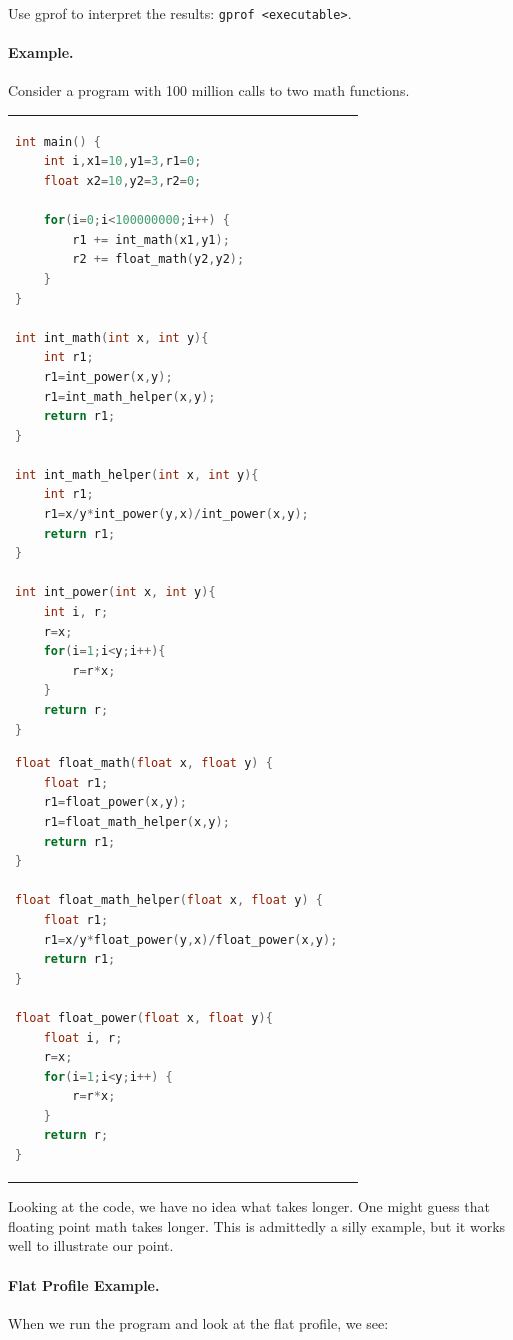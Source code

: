 Use gprof to interpret the results: {\tt gprof <executable>}.

\paragraph*{Example.} Consider a program with 100 million calls 
to two math functions.

\begin{tabular}{ll}
\begin{minipage}{.5\textwidth}
\begin{lstlisting}[language=C,basicstyle=\scriptsize]
int main() {
    int i,x1=10,y1=3,r1=0;
    float x2=10,y2=3,r2=0;

    for(i=0;i<100000000;i++) {
        r1 += int_math(x1,y1);
        r2 += float_math(y2,y2);
    }
}

int int_math(int x, int y){
    int r1;
    r1=int_power(x,y);
    r1=int_math_helper(x,y);
    return r1;
}

int int_math_helper(int x, int y){
    int r1;
    r1=x/y*int_power(y,x)/int_power(x,y);
    return r1;
}

int int_power(int x, int y){
    int i, r;
    r=x;
    for(i=1;i<y;i++){
        r=r*x;
    }
    return r;
}
\end{lstlisting}
\end{minipage}
\begin{minipage}{0.5\textwidth}
\begin{lstlisting}[language=C]
float float_math(float x, float y) {
    float r1;
    r1=float_power(x,y);
    r1=float_math_helper(x,y);
    return r1;
}

float float_math_helper(float x, float y) {
    float r1;
    r1=x/y*float_power(y,x)/float_power(x,y);
    return r1;
}

float float_power(float x, float y){
    float i, r;
    r=x;
    for(i=1;i<y;i++) {
        r=r*x;
    }
    return r;
}
  \end{lstlisting}
\end{minipage}
\end{tabular}

Looking at the code, we have no idea what takes longer.
One might guess that floating point math takes longer. This is admittedly a
silly example, but it works well to illustrate our point.

\paragraph{Flat Profile Example.}
    When we run the program and look at the flat profile, we see:

